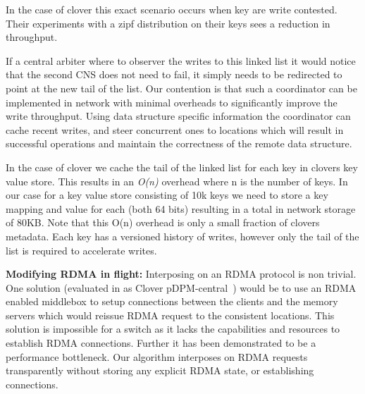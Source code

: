 In the case of clover this exact scenario occurs when key are write
contested. Their experiments with a zipf distribution on their keys
sees a  reduction in throughput.

If a central arbiter where to observer the writes to this linked list
it would notice that the second CNS does not need to fail, it simply
needs to be redirected to point at the new tail of the list. 
Our contention is that such a coordinator can be implemented in
network with minimal overheads to significantly improve the write
throughput. Using data structure specific information the coordinator
can cache recent writes, and steer concurrent ones to locations which
will result in successful operations and maintain the correctness of
the remote data structure.

In the case of clover we cache the tail of the linked list for each
key in clovers key value store. This results in an \textit{O(n)}
overhead where n is the number of keys. In our case for a key value
store consisting of 10k keys we need to store a key mapping and value
for each (both 64 bits) resulting in a total in network storage of
80KB. Note that this O(n) overhead is only a small fraction of clovers
metadata. Each key has a versioned history of writes, however only the
tail of the list is required to accelerate writes.

\textbf{Modifying RDMA in flight:} Interposing on an RDMA protocol is non
trivial. One solution (evaluated in as Clover
pDPM-central~\cite{clover}) would be to use an RDMA enabled middlebox
to setup connections between the clients and the memory servers which
would reissue RDMA request to the consistent locations. This solution
is impossible for a switch as it lacks the capabilities and resources
to establish RDMA connections. Further it has been demonstrated to be
a performance bottleneck. Our algorithm interposes on RDMA requests
transparently without storing any explicit RDMA state, or establishing
connections.

